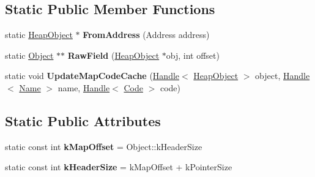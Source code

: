 \subsection*{Static Public Member Functions}
\begin{DoxyCompactItemize}
\item 
\hypertarget{classv8_1_1internal_1_1_heap_object_ac2dbe6768e6332fc90a987f23ca41ddb}{}static \hyperlink{classv8_1_1internal_1_1_heap_object}{Heap\+Object} $\ast$ {\bfseries From\+Address} (Address address)\label{classv8_1_1internal_1_1_heap_object_ac2dbe6768e6332fc90a987f23ca41ddb}

\item 
\hypertarget{classv8_1_1internal_1_1_heap_object_a41c3097b9cbd73e61cb1de6dd633f12c}{}static \hyperlink{classv8_1_1internal_1_1_object}{Object} $\ast$$\ast$ {\bfseries Raw\+Field} (\hyperlink{classv8_1_1internal_1_1_heap_object}{Heap\+Object} $\ast$obj, int offset)\label{classv8_1_1internal_1_1_heap_object_a41c3097b9cbd73e61cb1de6dd633f12c}

\item 
\hypertarget{classv8_1_1internal_1_1_heap_object_a811b269cf8b6a455b2717c6e50062c70}{}static void {\bfseries Update\+Map\+Code\+Cache} (\hyperlink{classv8_1_1internal_1_1_handle}{Handle}$<$ \hyperlink{classv8_1_1internal_1_1_heap_object}{Heap\+Object} $>$ object, \hyperlink{classv8_1_1internal_1_1_handle}{Handle}$<$ \hyperlink{classv8_1_1internal_1_1_name}{Name} $>$ name, \hyperlink{classv8_1_1internal_1_1_handle}{Handle}$<$ \hyperlink{classv8_1_1internal_1_1_code}{Code} $>$ code)\label{classv8_1_1internal_1_1_heap_object_a811b269cf8b6a455b2717c6e50062c70}

\end{DoxyCompactItemize}
\subsection*{Static Public Attributes}
\begin{DoxyCompactItemize}
\item 
\hypertarget{classv8_1_1internal_1_1_heap_object_a0c150f83dc5605634f591e84c8a8ce2a}{}static const int {\bfseries k\+Map\+Offset} = Object\+::k\+Header\+Size\label{classv8_1_1internal_1_1_heap_object_a0c150f83dc5605634f591e84c8a8ce2a}

\item 
\hypertarget{classv8_1_1internal_1_1_heap_object_ac3b060e34e0c5523cd8ad9d734a0a498}{}static const int {\bfseries k\+Header\+Size} = k\+Map\+Offset + k\+Pointer\+Size\label{classv8_1_1internal_1_1_heap_object_ac3b060e34e0c5523cd8ad9d734a0a498}

\end{DoxyCompactItemize}
